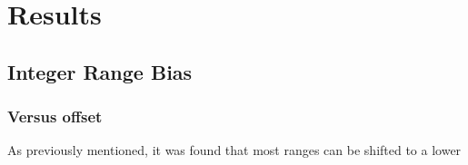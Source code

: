 \chapter{Results}\label{ch:results}
\section{Integer Range Bias}
\subsection{Versus offset}
As previously mentioned, it was found that most ranges can be shifted to a lower 